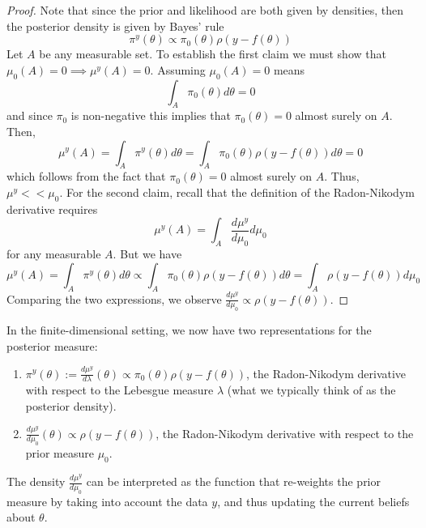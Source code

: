 \documentclass[12pt]{article}
\begin{document}
\begin{proof} 
Note that since the prior and likelihood are both given by densities, then the posterior density is given by Bayes' rule
\[\pi^y(\theta) \propto \pi_0(\theta) \rho(y - f(\theta))\]
Let $A$ be any measurable set. To establish the first claim we must show that $\mu_0(A) = 0 \implies \mu^y(A) = 0$. Assuming $\mu_0(A) = 0$ means
\[\int_A \pi_0(\theta) d\theta = 0\]
and since $\pi_0$ is non-negative this implies that $\pi_0(\theta) = 0$ almost surely on $A$. Then, 
\[\mu^y(A) = \int_A \pi^y(\theta) d\theta = \int_A \pi_0(\theta) \rho(y - f(\theta)) d\theta = 0\]
which follows from the fact that $\pi_0(\theta) = 0$ almost surely on $A$. Thus, $\mu^y << \mu_0$. For the second claim, recall that the definition of the Radon-Nikodym derivative requires 
\[\mu^y(A) = \int_A \frac{d\mu^y}{d\mu_0} d\mu_0\]
for any measurable $A$. But we have 
\[\mu^y(A) = \int_A \pi^y(\theta) d\theta \propto \int_A \pi_0(\theta) \rho(y - f(\theta)) d\theta = \int_A \rho(y - f(\theta)) d\mu_0 \]
Comparing the two expressions, we observe $\frac{d\mu^y}{d\mu_0} \propto \rho(y - f(\theta))$. 
\end{proof} 
In the finite-dimensional setting, we now have two representations for the posterior measure:
\begin{enumerate}
\item $\pi^y(\theta) := \frac{d\mu^y}{d\lambda}(\theta) \propto \pi_0(\theta)\rho(y - f(\theta))$, the Radon-Nikodym derivative with respect to the Lebesgue measure $\lambda$ (what we typically think of as the posterior density).
\item $\frac{d\mu^y}{d\mu_0}(\theta) \propto \rho(y - f(\theta))$, the Radon-Nikodym derivative with respect to the prior measure $\mu_0$. 
\end{enumerate}
The density $\frac{d\mu^y}{d\mu_0}$ can be interpreted as the function that re-weights the prior measure by taking into account the data $y$, and thus updating the current beliefs about $\theta$. 
\end{document}
